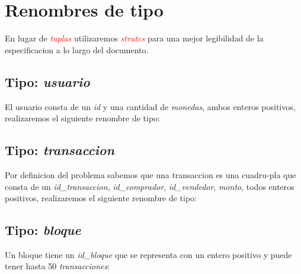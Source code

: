 \documentclass[10pt,a4paper]{article}
\begin{document}
\maketitle

\section{Renombres de tipo}
En lugar de \textcolor{red}{\textit{tuplas}} utilizaremos \textcolor{red}{\textit{strutcs}} para una mejor legibilidad de la especificacion a lo largo del documento.
\subsection{Tipo: \textit{usuario}}
El usuario consta de un \textit{id} y una cantidad de \textit{monedas}, ambos enteros positivos, realizaremos el siguiente renombre de tipo:

\vspace{0.3cm}
\noindent
{}
\vspace{0.1cm}

\subsection{Tipo: \textit{transaccion}}
Por definicion del problema sabemos que una transaccion es una cuadru-pla que consta de un \textit{id\_transaccion}, \textit{id\_comprador}, \textit{id\_vendedor}, \textit{monto}, todos enteros positivos, realizaremos el siguiente renombre de tipo:

\vspace{0.3cm}
\noindent
{}
\vspace{0.1cm}

\subsection{Tipo: \textit{bloque}}
Un bloque tiene un \textit{id\_bloque} que se representa con un entero positivo y puede tener hasta 50 \textit{transacciones}:
\end{document}
